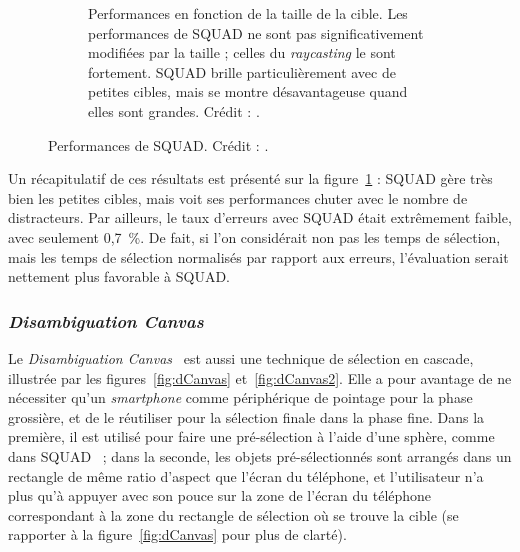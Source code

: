 \begin{figure}[!htbp]
\begin{center}
\begin{subfigure}[t]{\textwidth}
				\caption{Performances en fonction de la taille de la cible. Les performances de SQUAD ne sont pas significativement modifiées par la taille ; celles du \emph{raycasting} le sont fortement. SQUAD brille particulièrement avec de petites cibles, mais se montre désavantageuse quand elles sont grandes. Crédit : \cite{kopper2011rapid}.}
				\label{fig:squadRecap}
			\end{subfigure}
		\end{center}
		\caption[Performances de SQUAD]{Performances de SQUAD. Crédit : \cite{kopper2011rapid}.}
		\label{fig:squadPerf}
	\end{figure}
	
	Un récapitulatif de ces résultats est présenté sur la figure~\ref{fig:squadRecap} : SQUAD gère très bien les petites cibles, mais voit ses performances chuter avec le nombre de distracteurs. Par ailleurs, le taux d'erreurs avec SQUAD était extrêmement faible, avec seulement 0,7~\%{}. De fait, si l'on considérait non pas les temps de sélection, mais les temps de sélection normalisés par rapport aux erreurs, l'évaluation serait nettement plus favorable à SQUAD.
	
	\subsubsection{\emph{Disambiguation Canvas}}
	Le \emph{Disambiguation Canvas}~\cite{debarba2013disambiguation} est aussi une technique de sélection en cascade, illustrée par les figures~\ref{fig:dCanvas} et~\ref{fig:dCanvas2}. Elle a pour avantage de ne nécessiter qu'un \emph{smartphone} comme périphérique de pointage pour la phase grossière, et de le réutiliser pour la sélection finale dans la phase fine. Dans la première, il est utilisé pour faire une pré-sélection à l'aide d'une sphère, comme dans SQUAD~\cite{kopper2011rapid} ; dans la seconde, les objets pré-sélectionnés sont arrangés dans un rectangle de même ratio d'aspect que l'écran du téléphone, et l'utilisateur n'a plus qu'à appuyer avec son pouce sur la zone de l'écran du téléphone correspondant à la zone du rectangle de sélection où se trouve la cible (se rapporter à la figure~\ref{fig:dCanvas} pour plus de clarté).
		 
